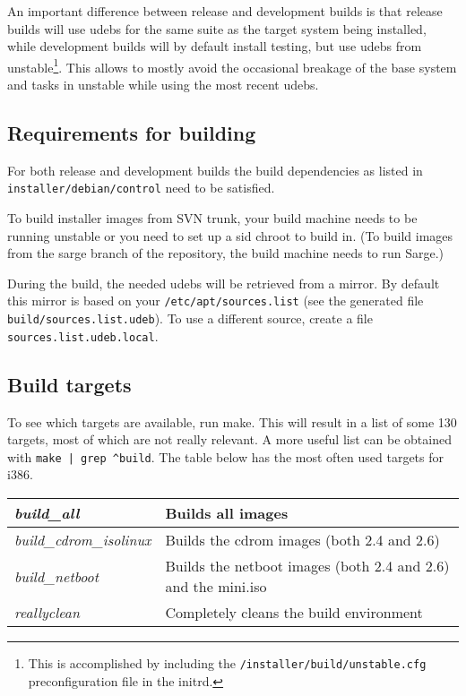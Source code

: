 \documentclass[a4paper,10pt]{article}
\begin{document}
An important difference between release and development builds is that release builds will use udebs for the same suite as the target system being installed, while development builds will by default install testing, but use udebs from unstable\footnote{This is accomplished by including the \texttt{/installer/build/unstable.cfg} preconfiguration file in the initrd.}. This allows to mostly avoid the occasional breakage of the base system and tasks in unstable while using the most recent udebs. 


\subsection{Requirements for building}
For both release and development builds the build dependencies as listed in \texttt{installer/debian/control} need to be satisfied. 

To build installer images from SVN trunk, your build machine needs to be running unstable or you need to set up a sid chroot to build in. (To build images from the sarge branch of the repository, the build machine needs to run Sarge.)

During the build, the needed udebs will be retrieved from a mirror. By default this mirror is based on your \texttt{/etc/apt/sources.list} (see the generated file \texttt{build/sources.list.udeb}). To use a different source, create a file \texttt{sources.list.udeb.local}.


\subsection{Build targets}
To see which targets are available, run make. This will result in a list of some 130 targets, most of which are not really relevant. A more useful list can be obtained with \texttt{make | grep \^{ }build}. The table below has the most often used targets for i386.

\begin{tabular}{|l|l|}
\hline
\textit{build\_all} & Builds all images \\
\hline
\textit{build\_cdrom\_isolinux} & Builds the cdrom images (both 2.4 and 2.6) \\
\hline
\textit{build\_netboot} & Builds the netboot images (both 2.4 and 2.6) and the mini.iso \\
\hline
\textit{reallyclean} & Completely cleans the build environment \\
\hline
\end{tabular} 
\end{document}
